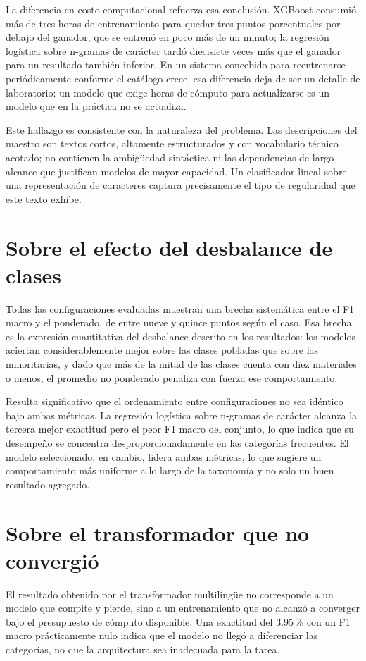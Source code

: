 La diferencia en costo computacional refuerza esa conclusión. XGBoost consumió más de tres horas de entrenamiento para quedar tres puntos porcentuales por debajo del ganador, que se entrenó en poco más de un minuto; la regresión logística sobre n-gramas de carácter tardó diecisiete veces más que el ganador para un resultado también inferior. En un sistema concebido para reentrenarse periódicamente conforme el catálogo crece, esa diferencia deja de ser un detalle de laboratorio: un modelo que exige horas de cómputo para actualizarse es un modelo que en la práctica no se actualiza.

Este hallazgo es consistente con la naturaleza del problema. Las descripciones del maestro son textos cortos, altamente estructurados y con vocabulario técnico acotado; no contienen la ambigüedad sintáctica ni las dependencias de largo alcance que justifican modelos de mayor capacidad. Un clasificador lineal sobre una representación de caracteres captura precisamente el tipo de regularidad que este texto exhibe.

\section{Sobre el efecto del desbalance de clases}
Todas las configuraciones evaluadas muestran una brecha sistemática entre el F1 macro y el ponderado, de entre nueve y quince puntos según el caso. Esa brecha es la expresión cuantitativa del desbalance descrito en los resultados: los modelos aciertan considerablemente mejor sobre las clases pobladas que sobre las minoritarias, y dado que más de la mitad de las clases cuenta con diez materiales o menos, el promedio no ponderado penaliza con fuerza ese comportamiento.

Resulta significativo que el ordenamiento entre configuraciones no sea idéntico bajo ambas métricas. La regresión logística sobre n-gramas de carácter alcanza la tercera mejor exactitud pero el peor F1 macro del conjunto, lo que indica que su desempeño se concentra desproporcionadamente en las categorías frecuentes. El modelo seleccionado, en cambio, lidera ambas métricas, lo que sugiere un comportamiento más uniforme a lo largo de la taxonomía y no solo un buen resultado agregado.

\section{Sobre el transformador que no convergió}
El resultado obtenido por el transformador multilingüe no corresponde a un modelo que compite y pierde, sino a un entrenamiento que no alcanzó a converger bajo el presupuesto de cómputo disponible. Una exactitud del 3.95\,\% con un F1 macro prácticamente nulo indica que el modelo no llegó a diferenciar las categorías, no que la arquitectura sea inadecuada para la tarea.

